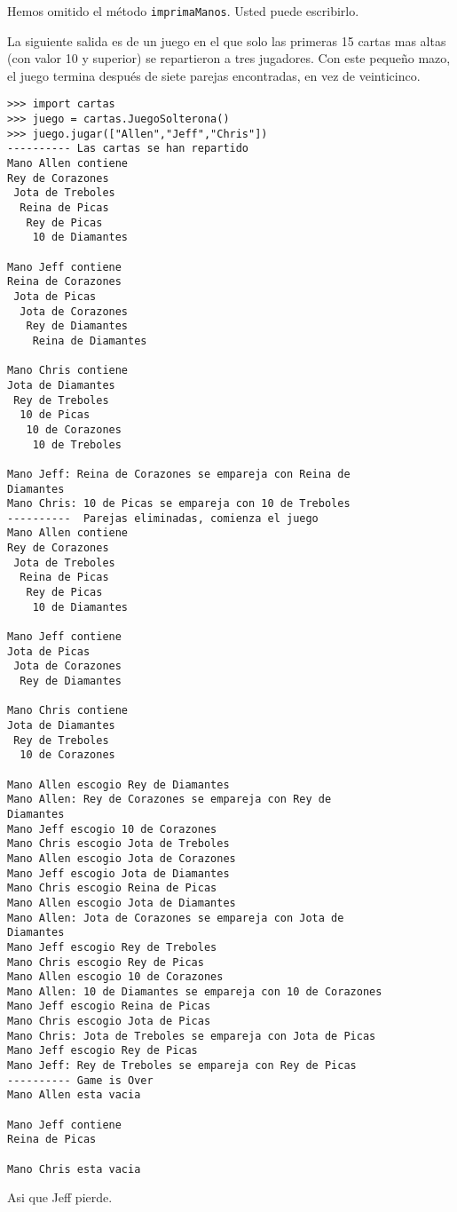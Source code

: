Hemos omitido el método  \texttt{imprimaManos}. Usted puede escribirlo.

La siguiente salida es de un juego en el que solo las primeras 15 cartas
mas altas (con valor 10 y superior) se repartieron a tres jugadores. Con 
este pequeño mazo, el juego termina después de siete parejas encontradas,
en vez de veinticinco.

\beforeverb
\begin{verbatim}
>>> import cartas
>>> juego = cartas.JuegoSolterona()
>>> juego.jugar(["Allen","Jeff","Chris"])
---------- Las cartas se han repartido
Mano Allen contiene
Rey de Corazones
 Jota de Treboles
  Reina de Picas
   Rey de Picas
    10 de Diamantes

Mano Jeff contiene
Reina de Corazones
 Jota de Picas
  Jota de Corazones
   Rey de Diamantes
    Reina de Diamantes

Mano Chris contiene
Jota de Diamantes
 Rey de Treboles
  10 de Picas
   10 de Corazones
    10 de Treboles

Mano Jeff: Reina de Corazones se empareja con Reina de 
Diamantes
Mano Chris: 10 de Picas se empareja con 10 de Treboles
----------  Parejas eliminadas, comienza el juego
Mano Allen contiene
Rey de Corazones
 Jota de Treboles
  Reina de Picas
   Rey de Picas
    10 de Diamantes

Mano Jeff contiene
Jota de Picas
 Jota de Corazones
  Rey de Diamantes

Mano Chris contiene
Jota de Diamantes
 Rey de Treboles
  10 de Corazones

Mano Allen escogio Rey de Diamantes
Mano Allen: Rey de Corazones se empareja con Rey de 
Diamantes
Mano Jeff escogio 10 de Corazones
Mano Chris escogio Jota de Treboles
Mano Allen escogio Jota de Corazones
Mano Jeff escogio Jota de Diamantes
Mano Chris escogio Reina de Picas
Mano Allen escogio Jota de Diamantes
Mano Allen: Jota de Corazones se empareja con Jota de 
Diamantes
Mano Jeff escogio Rey de Treboles
Mano Chris escogio Rey de Picas
Mano Allen escogio 10 de Corazones
Mano Allen: 10 de Diamantes se empareja con 10 de Corazones
Mano Jeff escogio Reina de Picas
Mano Chris escogio Jota de Picas
Mano Chris: Jota de Treboles se empareja con Jota de Picas
Mano Jeff escogio Rey de Picas
Mano Jeff: Rey de Treboles se empareja con Rey de Picas
---------- Game is Over
Mano Allen esta vacia

Mano Jeff contiene
Reina de Picas

Mano Chris esta vacia

\end{verbatim}
\afterverb
%
Asi que  Jeff pierde.



